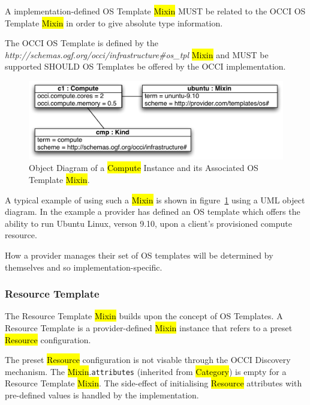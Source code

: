 \documentclass[10pt,a4paper]{article}
\begin{document}
A implementation-defined OS Template \hl{Mixin} MUST be related to 
the OCCI OS Template \hl{Mixin} in order to give absolute type information. 

The OCCI OS Template 
is defined by the \textit{http://schemas.ogf.org/occi/infrastructure\#os\_tpl} \hl{Mixin} and
MUST be supported SHOULD OS Templates be offered by the OCCI implementation.

\begin{figure}[!h]
	\centering
	\includegraphics[scale=0.5]{figs/infra_template_obj_diag1}
	\caption{Object Diagram of a \hl{Compute} Instance and its Associated OS Template \hl{Mixin}.}
	\label{fig:infra_template_obj_diag1}
\end{figure}

A typical example of using such a \hl{Mixin} is shown in
figure~\ref{fig:infra_template_obj_diag1} using a UML object diagram.
%
In the example
a provider has defined an OS template which offers the ability to run Ubuntu Linux,
verson 9.10, upon a client's provisioned compute resource.

How a provider manages their set of OS templates will be determined by themselves and so 
implementation-specific.

\subsubsection{Resource Template}
The Resource Template \hl{Mixin} builds upon the concept of OS Templates. A Resource Template is
a provider-defined \hl{Mixin} instance that refers to a preset \hl{Resource} configuration. 

The preset \hl{Resource} configuration is not visable through the OCCI
Discovery mechanism. The \hl{Mixin}.{\tt attributes} (inherited from
\hl{Category}) is empty for a Resource Template \hl{Mixin}.
The side-effect of initialising \hl{Resource} attributes with pre-defined
values is handled by the implementation.
\end{document}
